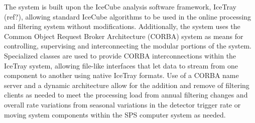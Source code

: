 The system is built upon the IceCube analysis software framework, IceTray (ref?), allowing standard IceCube algorithms to
be used in the online processing and filtering system without modifications.  Additionally, the system uses the 
Common Object Request Broker Architecture (CORBA) system as means for controlling, supervising and interconnecting
the modular portions of the system.  Specialized classes are used to provide CORBA interconnections
within the IceTray system, allowing file-like interfaces that let data to stream from one component to another
using native IceTray formats.  Use of a CORBA name server and a dynamic architecture allow for the
addition and remove of filtering clients as needed to meet the processing load from annual filtering
changes and overall rate variations from seasonal variations in the detector trigger rate or moving system components within the SPS
computer system as needed.

